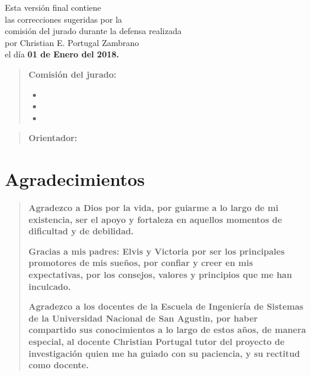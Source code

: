 \documentclass[12pt,oneside,a4paper]{book}
\begin{document}
    \vskip 2cm

   \begin{flushright}
          Esta versión final contiene\\
         las correcciones sugeridas por la \\
          comisión del jurado durante la defensa realizada\\
          por Christian E. Portugal Zambrano\\
          el día \textbf{01 de Enero del 2018.} 
    \vskip 1cm

    \end{flushright}
    \vskip 4.2cm

    \begin{quote}
    \noindent \textbf{Comisión del jurado:}
    
    \begin{itemize}
		\item  
		\item 
		\item
    \end{itemize} 
    \end{quote}
    \begin{quote}
    	\textbf{Orientador:}
    \end{quote}
\pagebreak
{}     %

\chapter*{Agradecimientos}

 
\begin{quotation}
\textbf{Agradezco a Dios por la vida, por guiarme a lo largo de mi existencia, ser el apoyo y fortaleza en aquellos momentos de dificultad y de debilidad.}

\textbf{Gracias a mis padres: Elvis y Victoria  por ser los principales promotores de mis sueños, por confiar y creer en mis expectativas, por los consejos, valores y principios que me han inculcado.}

\textbf{Agradezco a los docentes de la Escuela de Ingeniería de Sistemas de la Universidad Nacional de San Agustin, por haber compartido sus conocimientos a lo largo de estos años, de manera especial, al docente Christian Portugal tutor del proyecto de investigación quien me ha guiado con su paciencia, y su rectitud como docente.}
\end{quotation}
\end{document}
